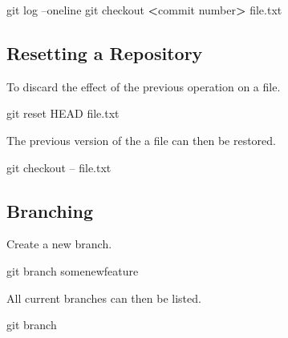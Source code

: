 \documentclass[]{book}
\newenvironment{Shaded}{\begin{snugshade}}{\end{snugshade}}
\newcommand{\FunctionTok}[1]{\textcolor[rgb]{0.00,0.00,0.00}{#1}}
\newcommand{\NormalTok}[1]{#1}
\newcommand{\OperatorTok}[1]{\textcolor[rgb]{0.81,0.36,0.00}{\textbf{#1}}}
\begin{document}
\begin{Shaded}
\begin{Highlighting}[]
\FunctionTok{git}\NormalTok{ log --oneline}
\FunctionTok{git}\NormalTok{ checkout }\OperatorTok{<}\NormalTok{commit number}\OperatorTok{>}\NormalTok{ file.txt}
\end{Highlighting}
\end{Shaded}

\hypertarget{resetting-a-repository}{%
\subsection{Resetting a Repository}\label{resetting-a-repository}}

To discard the effect of the previous operation on a file.

\begin{Shaded}
\begin{Highlighting}[]
\FunctionTok{git}\NormalTok{ reset HEAD file.txt}
\end{Highlighting}
\end{Shaded}

The previous version of the a file can then be restored.

\begin{Shaded}
\begin{Highlighting}[]
\FunctionTok{git}\NormalTok{ checkout -- file.txt}
\end{Highlighting}
\end{Shaded}

\hypertarget{branching}{%
\subsection{Branching}\label{branching}}

Create a new branch.

\begin{Shaded}
\begin{Highlighting}[]
\FunctionTok{git}\NormalTok{ branch somenewfeature}
\end{Highlighting}
\end{Shaded}

All current branches can then be listed.

\begin{Shaded}
\begin{Highlighting}[]
\FunctionTok{git}\NormalTok{ branch}
\end{Highlighting}
\end{Shaded}
\end{document}
